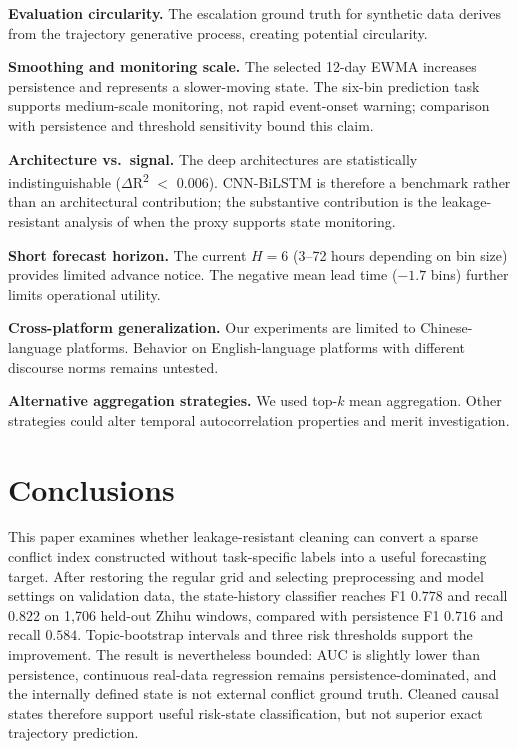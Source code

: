 \documentclass[11pt,a4paper]{article}
\begin{document}
\textbf{Evaluation circularity.} The escalation ground truth for synthetic data derives from the trajectory generative process, creating potential circularity.

\textbf{Smoothing and monitoring scale.} The selected 12-day EWMA increases persistence and represents a slower-moving state. The six-bin prediction task supports medium-scale monitoring, not rapid event-onset warning; comparison with persistence and threshold sensitivity bound this claim.

\textbf{Architecture vs.\ signal.} The deep architectures are statistically indistinguishable ($\Delta$R\textsuperscript{2} $<$ 0.006). CNN-BiLSTM is therefore a benchmark rather than an architectural contribution; the substantive contribution is the leakage-resistant analysis of when the proxy supports state monitoring.

\textbf{Short forecast horizon.} The current $H{=}6$ (3--72 hours depending on bin size) provides limited advance notice. The negative mean lead time ($-1.7$ bins) further limits operational utility.

\textbf{Cross-platform generalization.} Our experiments are limited to Chinese-language platforms. Behavior on English-language platforms with different discourse norms remains untested.

\textbf{Alternative aggregation strategies.} We used top-$k$ mean aggregation. Other strategies could alter temporal autocorrelation properties and merit investigation.

\section{Conclusions}

This paper examines whether leakage-resistant cleaning can convert a sparse conflict index constructed without task-specific labels into a useful forecasting target. After restoring the regular grid and selecting preprocessing and model settings on validation data, the state-history classifier reaches F1 $0.778$ and recall $0.822$ on 1,706 held-out Zhihu windows, compared with persistence F1 $0.716$ and recall $0.584$. Topic-bootstrap intervals and three risk thresholds support the improvement. The result is nevertheless bounded: AUC is slightly lower than persistence, continuous real-data regression remains persistence-dominated, and the internally defined state is not external conflict ground truth. Cleaned causal states therefore support useful risk-state classification, but not superior exact trajectory prediction.
\end{document}
